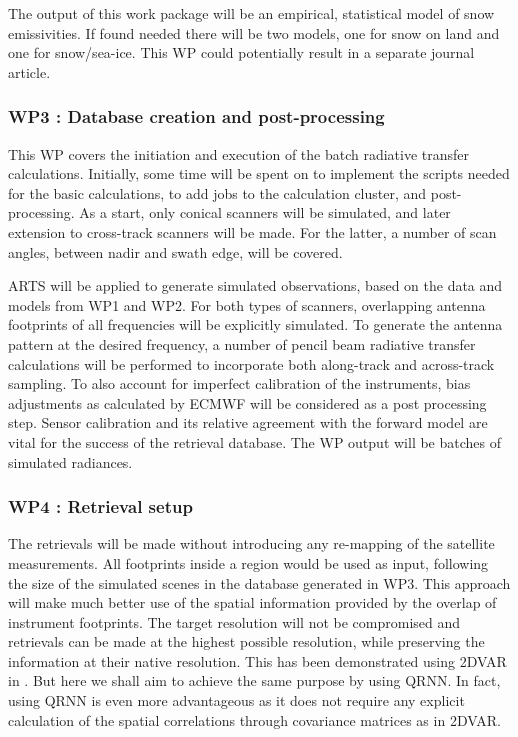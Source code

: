 \documentclass[12pt,oneside,a4paper]{article}
\begin{document}
The output of this work package will be an empirical, statistical model of
snow emissivities. If found needed there will be two models, one for snow on
land and one for snow/sea-ice. This WP could potentially result in a separate
journal article.
\vspace{-1.0ex}

\subsubsection*{WP3 : Database creation and post-processing}
%
\label{sec:database}	
This WP covers the initiation and execution of the batch radiative
transfer calculations. Initially, some time will be spent on to implement the
scripts needed for the basic calculations, to add jobs to the calculation
cluster, and post-processing. As a start, only conical scanners will be
simulated, and later extension to cross-track scanners will be made. For the
latter, a number of scan angles, between nadir and swath edge, will be covered.

ARTS will be applied to generate simulated observations, based on the data and
models from WP1 and WP2. For both types of scanners, overlapping antenna
footprints of all frequencies will be explicitly simulated. To generate the
antenna pattern at the desired frequency, a number of pencil beam radiative
transfer calculations will be performed to incorporate both along-track and
across-track sampling. To also account for imperfect calibration of the
instruments, bias adjustments as calculated by ECMWF will be considered as a
post processing step. Sensor calibration and its relative agreement with the
forward model are vital for the success of the retrieval database. The WP
output will be batches of simulated radiances.  \vspace{-1.0ex}


\subsubsection*{WP4 : Retrieval setup}
%
\label{sec:setup}
The retrievals will be made without introducing any re-mapping of the satellite
measurements. All footprints inside a region would be used as input, following
the size of the simulated scenes in the database generated in WP3. This
approach will make much better use of the spatial information provided by the
overlap of instrument footprints. The target resolution will not be
compromised and retrievals can be made at the highest possible resolution,
while preserving the information at their native resolution. This has been
demonstrated using 2DVAR in \citet{duncan:anexp:19}. But here we shall aim to
achieve the same purpose by using QRNN. In fact, using QRNN is even more advantageous as it does not require any explicit calculation of the spatial correlations through covariance matrices as in 2DVAR.
\end{document}
